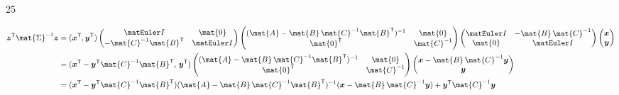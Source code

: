\documentclass{sotonExamBoxes}    %
\begin{document}
\begin{question}{25}
\begin{qparts}
{\begin{answer}
         \begin{align*}
           \bm{z}^{\tr}\mat{\Sigma}^{-1}\bm{z} &=
                                              (\bm{x}^{\tr},\bm{y}^{\tr})\begin{pmatrix}
                                                \Id & \mat{0} \\
                                                -\mat{C}^{-1}
                                                \mat{B}^{\tr} &
                                                \Id \end{pmatrix} \begin{pmatrix}
                                                (\mat{A}-
                                                \mat{B}\,\mat{C}^{-1}\mat{B}^\tr)^{-1}
                                                & \mat{0}\\
                                                \mat{0}^{\tr} &
                                                \mat{C}^{-1} \end{pmatrix} \begin{pmatrix}
                                                \Id &
                                                -\mat{B}\,\mat{C}^{-1}
                                                \\ \mat{0} &
                                                \Id \end{pmatrix} \begin{pmatrix}\bm{x}\\
                                                \bm{y}\end{pmatrix}\\ 
                                            &=
                                              (\bm{x}^{\tr}-\bm{y}^\tr\mat{C}^{-1}\mat{B}^{\tr},\,\bm{y}^{\tr}) \begin{pmatrix}
                                                (\mat{A}-
                                                \mat{B}\,\mat{C}^{-1}\mat{B}^{\tr})^{-1}
                                                & \mat{0}\\
                                                \mat{0}^{\tr} &
                                                \mat{C}^{-1} \end{pmatrix} \begin{pmatrix}\bm{x}-\mat{B}\,\mat{C}^{-1}\bm{y}\\
                                                \bm{y}\end{pmatrix}\\ 
                                            &=
                                              (\bm{x}^{\tr}-\bm{y}^{\tr}\mat{C}^{-1}\mat{B}^{\tr})(\mat{A}-
                                              \mat{B}\,\mat{C}^{-1}\mat{B}^{\tr})^{-1}(\bm{x}-\mat{B}\,\mat{C}^{-1}\bm{y})
                                              + \bm{y}^{\tr} \mat{C}^{-1}
                                              \bm{y}
         \end{align*}
       \end{answer}
}{}
       \clearpage
       

\end{qparts}
\end{question}
\end{document}
